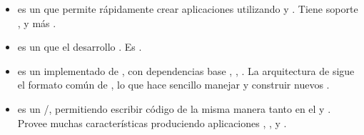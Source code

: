 \begin{itemize}
		\item
			\textbf{\saneNAME} es un \fullstackAS \javaScriptNAME que permite rápidamente crear aplicaciones \webINT \productionReadyPC utilizando \sailsNAME y \emberjsNAME. Tiene soporte \dockerNAME, \generatorsAS y más \cite{online_sanestack_official_site}.
		\item
			\textbf{\cokeNAME} es un \nodejsNAME \mvcAS \frameworkPC \lightweightPL que \speedupCPT el desarrollo \webINT. Es \modularizedAS \cite{online_cokejs_official_site}. 
		\item
			\textbf{\sleekjsNAME} es un \frameworkPC \mvcAS implementado de \nodejsNAME, \builtINPL con dependencias base \handlebarsNAMEref, \expressjsNAMEref, \mongooseNAME. La arquitectura de \sleekjsNAME sigue el formato común de \mvcAS, lo que hace sencillo manejar y construir nuevos \websitesINT \cite{online_sleekjs_official_site}.
		\item
			\textbf{\danfNAME} es un \fullstackAS \javaScriptNAME/\nodejsNAME \oopPL \frameworkPC, permitiendo escribir código de la misma manera tanto en el \serverSideAS y \clientSideAS. Provee muchas características produciendo aplicaciones \scalableQA, \maintainableQA, \testeableQA y \performanceQA\cite{online_danf_official_gitHub}.

	\end{itemize}
